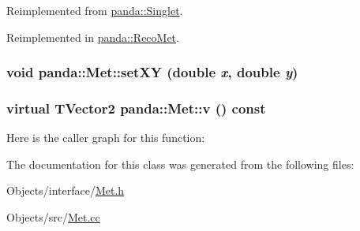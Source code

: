 Reimplemented from \hyperlink{classpanda_1_1Singlet_a161b3df14c430fd7f1afdd64d098b211}{panda::Singlet}.

Reimplemented in \hyperlink{classpanda_1_1RecoMet_a9457a28604d28d4f06346a121874dc27}{panda::RecoMet}.\hypertarget{classpanda_1_1Met_af3f84170e9ef0be9b78722d149eb7895}{
\subsubsection[{setXY}]{\setlength{\rightskip}{0pt plus 5cm}void panda::Met::setXY (double {\em x}, \/  double {\em y})}}
\label{classpanda_1_1Met_af3f84170e9ef0be9b78722d149eb7895}
\hypertarget{classpanda_1_1Met_a535aa3038be16e650ffcdf2d658d8ae6}{
\subsubsection[{v}]{\setlength{\rightskip}{0pt plus 5cm}virtual TVector2 panda::Met::v () const}}
\label{classpanda_1_1Met_a535aa3038be16e650ffcdf2d658d8ae6}


Here is the caller graph for this function:

The documentation for this class was generated from the following files:\begin{DoxyCompactItemize}
\item 
Objects/interface/\hyperlink{Met_8h}{Met.h}\item 
Objects/src/\hyperlink{Met_8cc}{Met.cc}\end{DoxyCompactItemize}

